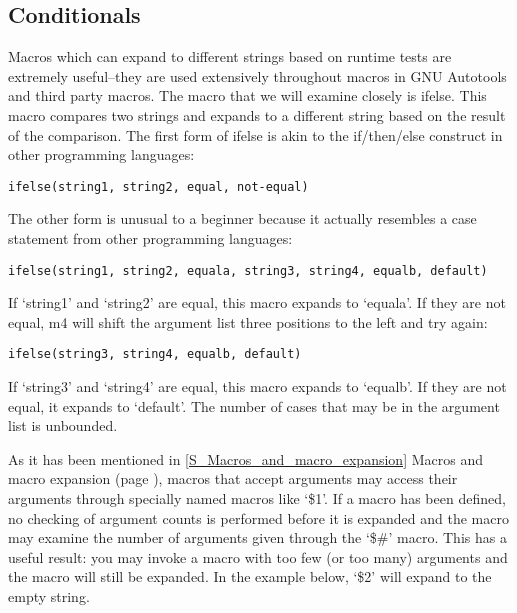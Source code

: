 \subsection{Conditionals}

Macros which can expand to different strings based on runtime tests are extremely useful--they are used extensively throughout macros in GNU Autotools and third party macros. The macro that we will examine closely is ifelse. This macro compares two strings and expands to a different string based on the result of the comparison. The first form of ifelse is akin to the if/then/else construct in other programming languages:

 	

\begin{verbatim}
ifelse(string1, string2, equal, not-equal)
\end{verbatim}

The other form is unusual to a beginner because it actually resembles a case statement from other programming languages:

 	

\begin{verbatim}
ifelse(string1, string2, equala, string3, string4, equalb, default)
\end{verbatim}

If `string1' and `string2' are equal, this macro expands to `equala'. If they are not equal, m4 will shift the argument list three positions to the left and try again:

 	

\begin{verbatim}
ifelse(string3, string4, equalb, default)
\end{verbatim}

If `string3' and `string4' are equal, this macro expands to `equalb'. If they are not equal, it expands to `default'. The number of cases that may be in the argument list is unbounded. 

As it has been mentioned in \ref{S_Macros_and_macro_expansion} Macros and 
macro expansion (page \pageref{S_Macros_and_macro_expansion}), macros that 
accept arguments may access their arguments through specially named macros 
like `\$1'. If a macro has been defined, no checking of argument counts is 
performed before it is expanded and the macro may examine the number of 
arguments given through the `\$\#' macro. This has a useful result: you may 
invoke a macro with too few (or too many) arguments and the macro will still 
be expanded. In the example below, `\$2' will expand to the empty string.

